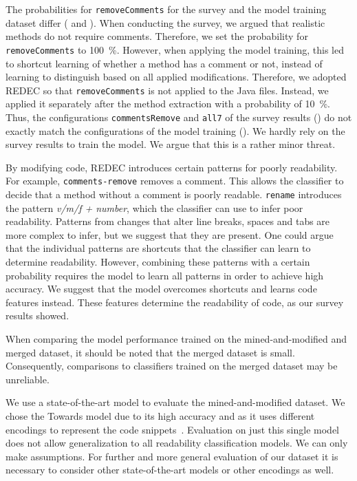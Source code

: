 \documentclass[%
class=scrreprt,
chapterprefix=false,%
open=right,%
twoside=true,%
paper=a4,%
logofile={Logo\_zentral\_farbig\_EN.png},%
thesistype=master,%
UKenglish,%
]{se2thesis}
\theoremstyle{definition}
\newcommand{\rdh}{REDEC\xspace}
\begin{document}
	The probabilities for \texttt{removeComments} for the survey and the model training dataset differ ( and ). When conducting the survey, we argued that realistic methods do not require comments. Therefore, we set the probability for \texttt{removeComments} to 100~\%. However, when applying the model training, this led to shortcut learning of whether a method has a comment or not, instead of learning to distinguish based on all applied modifications. Therefore, we adopted \rdh so that \texttt{removeComments} is not applied to the Java files. Instead, we applied it separately after the method extraction with a probability of 10~\%.
	Thus, the configurations \texttt{commentsRemove} and \texttt{all7} of the survey results () do not exactly match the configurations of the model training ().
	We hardly rely on the survey results to train the model. We argue that this is a rather minor threat.
	
	By modifying code, REDEC introduces certain patterns for poorly readability. For example, \texttt{comments-remove} removes a comment. This allows the classifier to decide that a method without a comment is poorly readable. \texttt{rename} introduces the pattern \textit{v/m/f + number}, which the classifier can use to infer poor readability. Patterns from changes that alter line breaks, spaces and tabs are more complex to infer, but we suggest that they are present. One could argue that the individual patterns are shortcuts that the classifier can learn to determine readability. However, combining these patterns with a certain probability requires the model to learn all patterns in order to achieve high accuracy. We suggest that the model overcomes shortcuts and learns code features instead. These features determine the readability of code, as our survey results showed.
	
	When comparing the model performance trained on the mined-and-modified and merged dataset, it should be noted that the merged dataset is small. Consequently, comparisons to classifiers trained on the merged dataset may be unreliable.
	
	We use a state-of-the-art model to evaluate the mined-and-modified dataset. We chose the Towards model due to its high accuracy and as it uses different encodings to represent the code snippets~\cite{mi2022towards}. Evaluation on just this single model does not allow generalization to all readability classification models. We can only make assumptions. For further and more general evaluation of our dataset it is necessary to consider other state-of-the-art models or other encodings as well.
\end{document}
